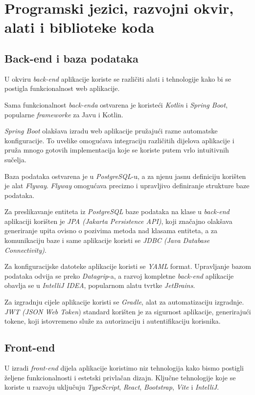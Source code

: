 		
		\section{Programski jezici, razvojni okvir, alati i biblioteke koda}
		
		
		\subsection{Back-end i baza podataka}
		U okviru \textit{back-end} aplikacije koriste se različiti alati i tehnologije kako bi se postigla funkcionalnost web aplikacije. 
		
		Sama funkcionalnost \textit{back-enda} ostvarena je koristeći \textit{Kotlin} i \textit{Spring Boot}, popularne \textit{frameworke} za Javu i Kotlin.
		
		\textit{Spring Boot} olakšava izradu web aplikacije pružajući razne automatske konfiguracije. To uvelike omogućava integraciju različitih dijelova aplikacije i pruža mnogo gotovih implementacija koje se koriste putem vrlo intuitivnih sučelja.
		
		Baza podataka ostvarena je u \textit{PostgreSQL}-u, a za njenu jasnu definiciju korišten je alat \textit{Flyway}. \textit{Flyway} omogućava precizno i upravljivo definiranje strukture baze podataka.
		
		Za preslikavanje entiteta iz \textit{PostgreSQL} baze podataka na klase u \textit{back-end} aplikaciji korišten je \textit{JPA (Jakarta Persistence API)}, koji značajno olakšava generiranje upita ovisno o pozivima metoda nad klasama entiteta, a za komunikaciju baze i same aplikacije koristi se \textit{JDBC (Java Database Connectivity)}.
		
		Za konfiguracijske datoteke aplikacije koristi se \textit{YAML} format. Upravljanje bazom podataka odvija se preko \textit{Datagrip}-a, a razvoj kompletne \textit{back-end} aplikacije obavlja se u \textit{IntelliJ IDEA}, popularnom alatu tvrtke \textit{JetBrains}. 
		
		Za izgradnju cijele aplikacije koristi se \textit{Gradle}, alat za automatizaciju izgradnje. 
\textit{JWT (JSON Web Token}) standard korišten je za sigurnost aplikacije, generirajući tokene, koji istovremeno služe za autorizaciju i autentifikaciju korisnika.


			\subsection{Front-end}
			U izradi \textit{front-end} dijela aplikacije koristimo niz tehnologija kako bismo postigli željene funkcionalnosti i estetski privlačan dizajn. Ključne tehnologije koje se koriste u razvoju uključuju \textit{TypeScript}, \textit{React}, \textit{Bootstrap}, \textit{Vite} i \textit{IntelliJ}.
			
